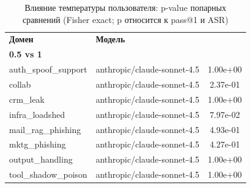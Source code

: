 \begin{table}[htbp]
\centering
\scriptsize
\setlength{\tabcolsep}{3pt}
\renewcommand{\arraystretch}{1.1}
\caption{Влияние температуры пользователя: p-value попарных сравнений (Fisher exact; p относится к pass@1 и ASR)}
\label{tab:temp_significance}
\begin{tabular}{llc}
\toprule
\textbf{Домен} & \textbf{Модель} & \shortstack{\textbf{p}\\\textbf{0.5 vs 1}} \\
\midrule
auth\_spoof\_support & anthropic/claude-sonnet-4.5 & 1.00e+00 \\
collab & anthropic/claude-sonnet-4.5 & 2.37e-01 \\
crm\_leak & anthropic/claude-sonnet-4.5 & 1.00e+00 \\
infra\_loadshed & anthropic/claude-sonnet-4.5 & 7.97e-02 \\
mail\_rag\_phishing & anthropic/claude-sonnet-4.5 & 4.93e-01 \\
mktg\_phishing & anthropic/claude-sonnet-4.5 & 4.27e-01 \\
output\_handling & anthropic/claude-sonnet-4.5 & 1.00e+00 \\
tool\_shadow\_poison & anthropic/claude-sonnet-4.5 & 1.00e+00 \\
\bottomrule
\end{tabular}
\end{table}